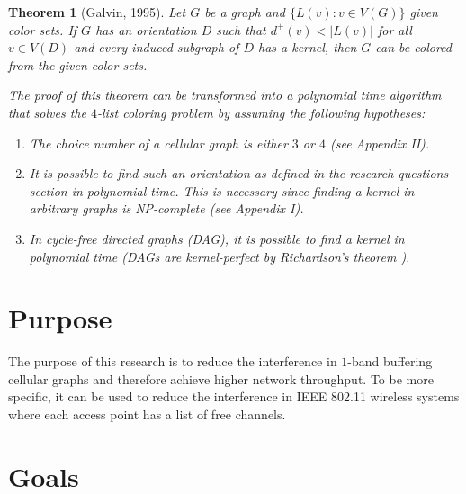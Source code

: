 \documentclass[letterpaper, 10 pt, conference]{ieeeconf}  %
\newtheorem{thm}{Theorem}
\begin{document}
\begin{thm}[Galvin, 1995]\label{thm:galvin} Let $G$ be a graph and $\lbrace L(v) : v \in V(G) \rbrace$ given color sets. If $G$ has an orientation $D$ such that $d^+(v) < |L(v)|$ for all $v \in V(D)$ and every induced subgraph of $D$ has a kernel, then $G$ can be colored from the given color sets.

The proof of this theorem can be transformed into a polynomial time algorithm that solves the $4$-list coloring problem by assuming the following hypotheses:

\begin{enumerate}
\item The choice number of a cellular graph is either $3$ or $4$ (see Appendix II).
\item It is possible to find such an orientation as defined in the research questions section in polynomial time. This is necessary since finding a kernel in arbitrary graphs is NP-complete \cite{chvatal} (see Appendix I).
\item In cycle-free directed graphs (DAG), it is possible to find a kernel in polynomial time (DAGs are kernel-perfect by Richardson's theorem \cite{richardson1946}).
\end{enumerate}
\end{thm}

\section{Purpose}

The purpose of this research is to reduce the interference in $1$-band buffering cellular graphs and therefore achieve higher network throughput. To be more specific, it can be used to reduce the interference in IEEE 802.11 wireless systems where each access point has a list of free channels.

\section{Goals}

\end{document}
